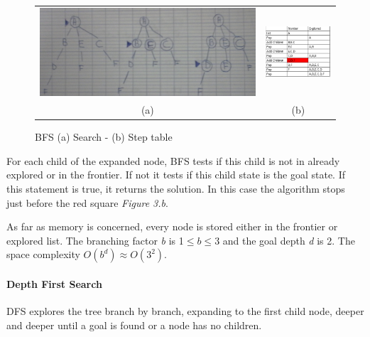 \begin{figure}[h]
    \centering
    \begin{tabular}{cc}
      \includegraphics[width=.54\linewidth,scale=1]{./images/bfs.jpg} & \includegraphics[width=.29  \linewidth, scale=1.5]{./images/bfs_table.jpg} \\
      \hspace{0.5cm} (a) & \hspace{0.5cm} (b)
    \end{tabular}
    \caption{BFS (a) Search - (b) Step table \label{fig:BFS}}
\end{figure}

For each child of the expanded node, BFS tests if this child is not in already
explored or in the frontier. If not it tests if this child state is the goal
state. If this statement is true, it returns the solution.
In this case the algorithm stops just before the red square \textit{Figure 3.b}.

As far as memory is concerned, every node is stored either in the frontier or explored
list. The branching factor \textit{b} is 1$\leq b \leq$3 and the goal depth \textit{d} is 2.
The space complexity $O(b^d) \approx O(3^2)$.

\paragraph{Depth First Search}

DFS explores the tree branch by branch, expanding to the first child node,
deeper and deeper until a goal is found or a node has no children.

